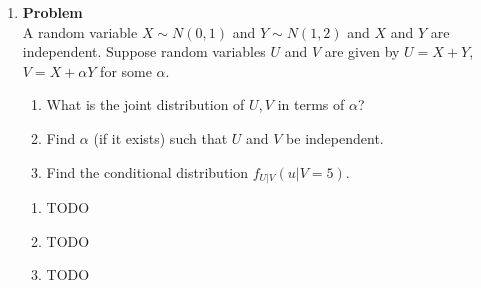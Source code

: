 \documentclass[12pt]{article}
\newenvironment{Ex}{\textbf{Problem}\vspace{.75em}\\}{}
\begin{document}
\begin{enumerate}
\begin{Ex}
    On the second Tuesday night of every month, the club holds a
    meeting. Each member attends the meeting with probability $q$,
    independently of all the other members. If a member $i$ attends
    the meeting, then he/she brings an amount of money, $M_i$, which is a
    continuous random variable with PDF
    \begin{equation}
      \label{eq:4-question-1}
      f_{M_{i}}(m) = \lambda e^{-\lambda m}\quad m\ge0
    \end{equation}
    Determine:
    \begin{enumerate}
    \item The expectation and variance of the number of members
      showing up to the meeting.
    \item The expectation and variance for the total amount of money
      brought to the meeting.
    \end{enumerate}
    \begin{solution} \hfill
      \begin{enumerate}
      \item {\color{red} \huge TODO}
      \item {\color{red} \huge TODO}
      \end{enumerate}
    \end{solution}
  \end{Ex}
\item
  \begin{Ex}
    A random variable $X \sim N(0,1)$ and $Y \sim N(1,2)$ and $X$ and
    $Y$ are independent. Suppose random variables $U$ and $V$ are
    given by $U=X+Y$, $V=X+\alpha Y$ for some $\alpha$.
    \begin{enumerate}
    \item What is the joint distribution of $U,V$ in terms of
      $\alpha$?
    \item Find $\alpha$ (if it exists) such that $U$ and $V$ be
      independent.
    \item Find the conditional distribution $f_{U|V}(u|V = 5)$.
    \end{enumerate}
    \begin{solution} \hfill
      \begin{enumerate}
      \item {\color{red} \huge TODO}
      \item {\color{red} \huge TODO}
      \item {\color{red} \huge TODO}
      \end{enumerate}

\end{solution}
\end{Ex}
\end{enumerate}
\end{document}
